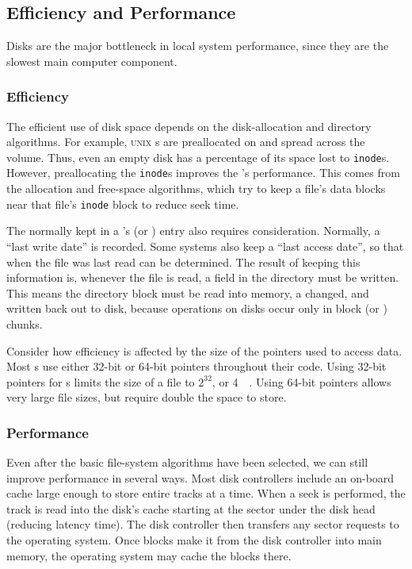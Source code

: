 \subsection{Efficiency and Performance}\label{subsec:Efficiency_Performance}
Disks are the major bottleneck in local system performance, since they are the slowest main computer component.

\subsubsection{Efficiency}\label{subsubsec:Efficiency}
The efficient use of disk space depends on the disk-allocation and directory algorithms.
For example, \textsc{unix} s are preallocated on and spread across the volume.
Thus, even an empty disk has a percentage of its space lost to \texttt{inode}s.
However, preallocating the \texttt{inode}s improves the 's performance.
This comes from the allocation and free-space algorithms, which try to keep a file’s data blocks near that file’s \texttt{inode} block to reduce seek time.

The  normally kept in a 's  (or ) entry also requires consideration.
Normally, a ``last write date'' is recorded.
Some systems also keep a ``last access date'', so that when the file was last read can be determined.
The result of keeping this information is, whenever the file is read, a field in the directory must be written.
This means the directory block must be read into memory, a changed, and written back out to disk, because operations on disks occur only in block (or ) chunks.

Consider how efficiency is affected by the size of the pointers used to access data.
Most s use either 32-bit or 64-bit pointers throughout their code.
Using 32-bit pointers for s limits the size of a file to $2^{32}$, or \SI{4}{\gibi{} \byte{}}.
Using 64-bit pointers allows very large file sizes, but require double the space to store.

\subsubsection{Performance}\label{subsubsec:Performance}
Even after the basic file-system algorithms have been selected, we can still improve performance in several ways.
Most disk controllers include an on-board cache large enough to store entire tracks at a time.
When a seek is performed, the track is read into the disk's cache starting at the sector under the disk head (reducing latency time).
The disk controller then transfers any sector requests to the operating system.
Once blocks make it from the disk controller into main memory, the operating system may cache the blocks there.

